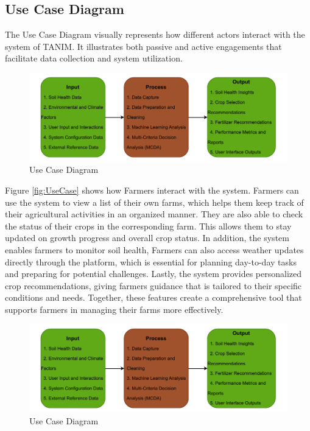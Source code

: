 {	\subsection{Use Case Diagram}
	The Use Case Diagram visually represents how different actors interact with the system of TANIM. It illustrates both passive and active engagements that facilitate data collection and system utilization.
	
	\begin{figure}[H]
		\centering
		\caption{Use Case Diagram}
		\label{fig:FarmerUseCase}
		\includegraphics[width=1\textwidth]{figures/IPO.pdf}
	\end{figure}
	
	Figure \ref{fig:UseCase} shows how Farmers interact with the system. Farmers can use the system to view a list of their own farms, which helps them keep track of their agricultural activities in an organized manner. They are also able to check the status of their crops in the corresponding farm. This allows them to stay updated on growth progress and overall crop status. In addition, the system enables farmers to monitor soil health, Farmers can also access weather updates directly through the platform, which is essential for planning day-to-day tasks and preparing for potential challenges. Lastly, the system provides personalized crop recommendations, giving farmers guidance that is tailored to their specific conditions and needs. Together, these features create a comprehensive tool that supports farmers in managing their farms more effectively.
	
	\begin{figure}[H]
		\centering
		\caption{Use Case Diagram}
		\label{fig:DAUseCase}
		\includegraphics[width=1\textwidth]{figures/IPO.pdf}
	\end{figure}
	
}
